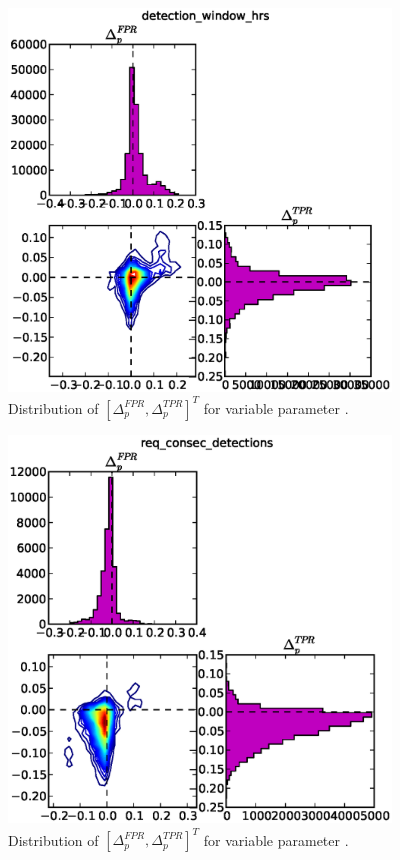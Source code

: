 \begin{figure}[!h]
\begin{center}
\includegraphics[width=4in]{../fig/final/delta_hist/detection_window_hrs}
\end{center}
\caption{\label{fig:deltas5}  Distribution of $[\Delta_p^{FPR},\Delta_p^{TPR}]^T$
  for variable parameter .}
\end{figure}

\begin{figure}[!h]
\begin{center}
\includegraphics[width=4in]{../fig/final/delta_hist/req_consec_detections}
\end{center}
\caption{\label{fig:deltas6} Distribution of $[\Delta_p^{FPR},\Delta_p^{TPR}]^T$
  for variable parameter .}
\end{figure}

